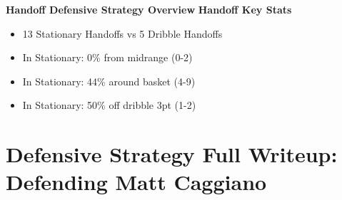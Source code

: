 \documentclass[a4paper,12pt]{article}
\begin{document}
\vspace{5em}

\noindent \textbf{Handoff Defensive Strategy Overview}
\hfill \textbf{Handoff Key Stats}
\begin{table}[H]
    \flushleft
    \hfill
    \begin{minipage}[c]{0.5\textwidth}
        {\small
        \begin{itemize}[rightmargin= 0em, label=\textbullet]
            \item 13 Stationary Handoffs vs 5 Dribble Handoffs \vspace{.5em}

            \item In Stationary: 0\% from midrange (0-2)\vspace{.5em}

            \item In Stationary: 44\% around basket (4-9)\vspace{.5em}

            \item In Stationary: 50\% off dribble 3pt (1-2)\vspace{.5em}
        \end{itemize}
        }
    \end{minipage}
    
\end{table}


\vspace{1em}

\section*{Defensive Strategy Full Writeup: Defending Matt Caggiano}
\end{document}
